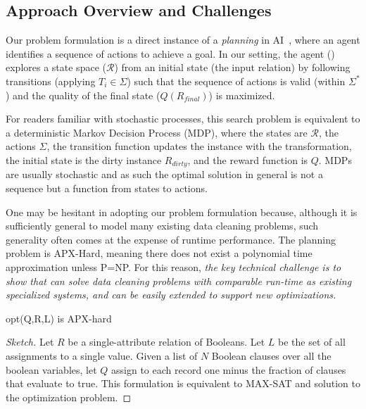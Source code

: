 \subsection{Approach Overview and Challenges}
Our problem formulation is a direct instance of a {\it planning} in AI~\cite{russell1995modern}, where an agent identifies a sequence of actions to achieve a goal.  In our setting, the agent (\sys) explores a state space ($\mathcal{R}$) from an initial state (the input relation) by following transitions (applying $T_i \in \Sigma$) such that the sequence of actions is valid (within $\Sigma^*$) and the quality of the final state ($Q(R_{final})$) is maximized.  

For readers familiar with stochastic processes, this search problem is equivalent to a deterministic Markov Decision Process (MDP), where the states are $\mathcal{R}$, the actions $\Sigma$, the transition function updates the instance with the transformation, the initial state is the dirty instance $R_{dirty}$, and the reward function is $Q$. MDPs are usually stochastic and as such the optimal solution in general is not a sequence but a function from states to actions.

One may be hesitant in adopting our problem formulation because, although it is sufficiently general to model many existing data cleaning problems, such generality often comes at the expense of runtime performance.   The planning problem is APX-Hard, meaning there does not exist a polynomial time approximation unless P=NP.  For this reason, {\it the key technical challenge is to show that \sys can solve data cleaning problems with comparable run-time as existing specialized systems, and can be easily extended to support new optimizations.}

\begin{theorem}[Hardness]
\textsf{opt}(Q,R,L) is APX-hard
\end{theorem}
\begin{proof}[Sketch]
Let $R$ be a single-attribute relation of Booleans. Let $L$ be the set of all assignments to a single value.
Given a list of $N$ Boolean clauses over all the boolean variables, let $Q$ assign to each record one minus the fraction of clauses that evaluate to true. This formulation is equivalent to MAX-SAT and solution to the optimization problem. 
\end{proof}

